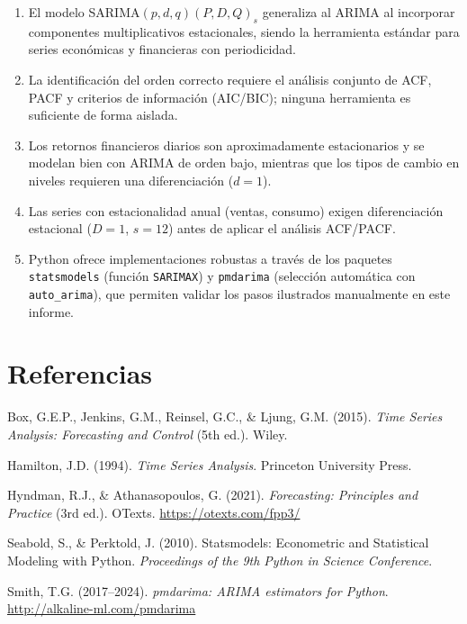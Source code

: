 \documentclass[12pt,a4paper]{article}
\begin{document}
\begin{enumerate}[label=\arabic*., leftmargin=*]
  \item El modelo SARIMA$(p,d,q)(P,D,Q)_s$ generaliza al ARIMA al incorporar
        componentes multiplicativos estacionales, siendo la herramienta est{\'a}ndar
        para series econ{\'o}micas y financieras con periodicidad.

  \item La identificaci{\'o}n del orden correcto requiere el an{\'a}lisis conjunto de
        ACF, PACF y criterios de informaci{\'o}n (AIC/BIC); ninguna herramienta es
        suficiente de forma aislada.

  \item Los retornos financieros diarios son aproximadamente estacionarios y
        se modelan bien con ARIMA de orden bajo, mientras que los tipos de
        cambio en niveles requieren una diferenciaci{\'o}n ($d=1$).

  \item Las series con estacionalidad anual (ventas, consumo) exigen diferenciaci{\'o}n
        estacional ($D=1$, $s=12$) antes de aplicar el an{\'a}lisis ACF/PACF.

  \item Python ofrece implementaciones robustas a trav{\'e}s de los paquetes
        \texttt{statsmodels} (funci{\'o}n \texttt{SARIMAX}) y \texttt{pmdarima}
        (selecci{\'o}n autom{\'a}tica con \texttt{auto\_arima}), que permiten validar
        los pasos ilustrados manualmente en este informe.
\end{enumerate}

\section*{Referencias}

\begin{enumerate}[label={[\arabic*]}, leftmargin=*]
  \item Box, G.E.P., Jenkins, G.M., Reinsel, G.C., \& Ljung, G.M. (2015).
        \textit{Time Series Analysis: Forecasting and Control} (5th ed.).
        Wiley.

  \item Hamilton, J.D. (1994).
        \textit{Time Series Analysis}.
        Princeton University Press.

  \item Hyndman, R.J., \& Athanasopoulos, G. (2021).
        \textit{Forecasting: Principles and Practice} (3rd ed.).
        OTexts. \url{https://otexts.com/fpp3/}

  \item Seabold, S., \& Perktold, J. (2010).
        Statsmodels: Econometric and Statistical Modeling with Python.
        \textit{Proceedings of the 9th Python in Science Conference}.

  \item Smith, T.G. (2017--2024).
        \textit{pmdarima: ARIMA estimators for Python}.
        \url{http://alkaline-ml.com/pmdarima}
\end{enumerate}
\end{document}
